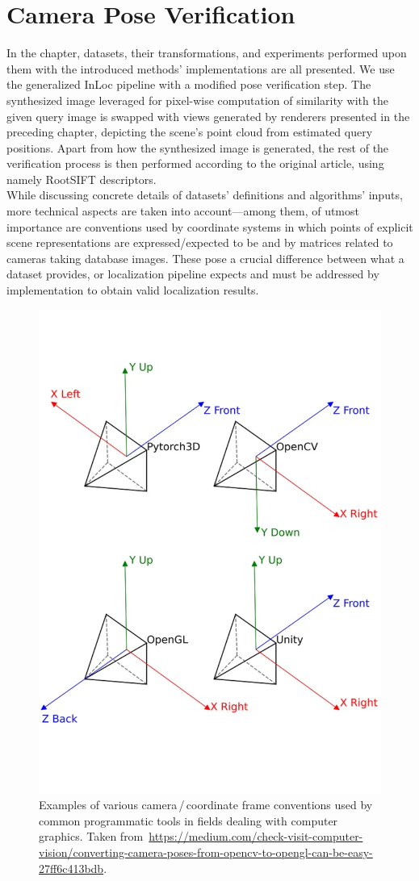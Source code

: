 \chapter{Camera Pose Verification}

In the chapter, datasets, their transformations, and experiments performed upon them with
the introduced methods' implementations are all presented. We use the generalized InLoc
pipeline with a modified pose verification step. The synthesized image leveraged for
pixel-wise computation of similarity with the given query image is swapped with views
generated by renderers presented in the preceding chapter, depicting the scene's point
cloud from estimated query positions. Apart from how the synthesized image is generated,
the rest of the verification process is then performed according to the original article,
using namely RootSIFT descriptors.\\

While discussing concrete details of datasets' definitions and algorithms' inputs, more
technical aspects are taken into account---among them, of utmost importance are
conventions used by coordinate systems in which points of explicit scene representations
are expressed/expected to be and by matrices related to cameras taking database images.
These pose a crucial difference between what a dataset provides, or localization pipeline
expects and must be addressed by implementation to obtain valid localization results.

\begin{figure}
    \centering
    \includegraphics[width=.7\textwidth]{../graphics/cs_conventions.png}
    \caption[Examples of various camera\,/\,coordinate frame conventions]{
    Examples of various camera\,/\,coordinate frame conventions used by
    common programmatic tools in fields dealing with computer graphics.
    Taken from~\url{https://medium.com/check-visit-computer-vision/converting-camera-poses-from-opencv-to-opengl-can-be-easy-27ff6c413bdb}.}\label{fig:cs_conventions}
\end{figure}

